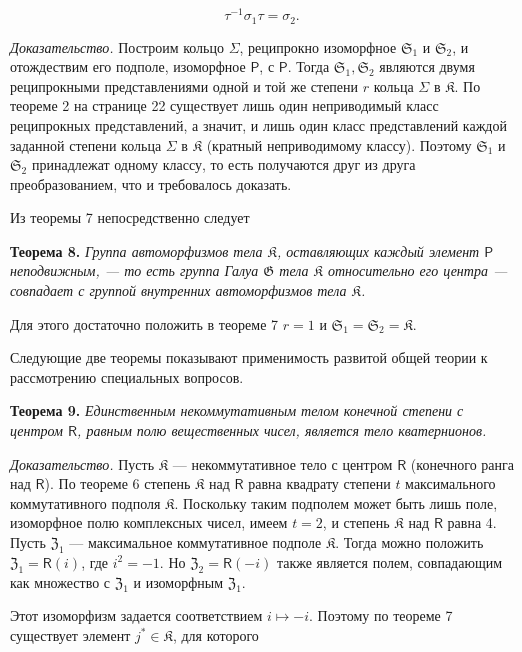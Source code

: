 \documentclass[11pt]{article}
\begin{document}
\[
\tau^{-1}\sigma_1\tau=\sigma_2.
\]

\emph{Доказательство.} Построим кольцо \(\Sigma\), реципрокно изоморфное \(\mathfrak S_1\) и \(\mathfrak S_2\), и отождествим его подполе, изоморфное \(\mathsf P\), с \(\mathsf P\). Тогда \(\mathfrak S_1,\mathfrak S_2\) являются двумя реципрокными представлениями одной и той же степени \(r\) кольца \(\Sigma\) в \(\mathfrak K\). По теореме 2 на странице 22 существует лишь один неприводимый класс реципрокных представлений, а значит, и лишь один класс представлений каждой заданной степени кольца \(\Sigma\) в \(\mathfrak K\) (кратный неприводимому классу). Поэтому \(\mathfrak S_1\) и \(\mathfrak S_2\) принадлежат одному классу, то есть получаются друг из друга преобразованием, что и требовалось доказать.

Из теоремы 7 непосредственно следует

\textbf{Теорема 8.} \emph{Группа автоморфизмов тела \(\mathfrak K\), оставляющих каждый элемент \(\mathsf P\) неподвижным, --- то есть группа Галуа \(\mathfrak G\) тела \(\mathfrak K\) относительно его центра --- совпадает с группой внутренних автоморфизмов тела \(\mathfrak K\).}

Для этого достаточно положить в теореме 7 \(r=1\) и \(\mathfrak S_1=\mathfrak S_2=\mathfrak K\).

Следующие две теоремы показывают применимость развитой общей теории к рассмотрению специальных вопросов.

\textbf{Теорема 9.} \emph{Единственным некоммутативным телом конечной степени с центром \(\mathsf{R}\), равным полю вещественных чисел, является тело кватернионов.}

\emph{Доказательство.} Пусть \(\mathfrak K\) --- некоммутативное тело с центром \(\mathsf{R}\) (конечного ранга над \(\mathsf{R}\)). По теореме 6 степень \(\mathfrak K\) над \(\mathsf{R}\) равна квадрату степени \(t\) максимального коммутативного подполя \(\mathfrak K\). Поскольку таким подполем может быть лишь поле, изоморфное полю комплексных чисел, имеем \(t=2\), и степень \(\mathfrak K\) над \(\mathsf{R}\) равна 4. Пусть \(\mathfrak Z_1\) --- максимальное коммутативное подполе \(\mathfrak K\). Тогда можно положить \(\mathfrak Z_1=\mathsf{R}(i)\), где \(i^2=-1\). Но \(\mathfrak Z_2=\mathsf{R}(-i)\) также является полем, совпадающим как множество с \(\mathfrak Z_1\) и изоморфным \(\mathfrak Z_1\).

Этот изоморфизм задается соответствием \(i\mapsto -i\). Поэтому по теореме 7 существует элемент \(j^*\in\mathfrak K\), для которого
\end{document}
